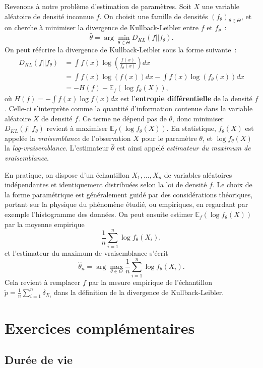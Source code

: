 Revenons à notre problème d'estimation de paramètres. Soit \(X\) une
variable aléatoire de densité inconnue \(f\). On choisit une famille de
densités \((f_\theta)_{\theta \in \Theta}\), et on cherche à minimiser
la divergence de Kullback-Leibler entre \(f\) et \(f_\theta\)~:
\[ \hat{\theta} = \arg\min_{\theta \in \Theta} D_{KL}(f||f_\theta).\] On
peut réécrire la divergence de Kullback-Leibler sous la forme suivante~:
\begin{align*}
D_{KL}(f||f_\theta) & = \int f(x) \log\left(\frac{f(x)}{f_\theta(x)}\right) dx \\
& = \int f(x) \log(f(x)) dx - \int f(x) \log(f_\theta(x)) dx \\
& = -H(f) - \mathbb{E}_f(\log f_\theta(X)),
\end{align*} où \(H(f) = -\int f(x) \log f(x) dx\) est
l'\textbf{entropie différentielle} de la densité \(f\). Celle-ci s'interprète comme la quantité d'information contenue dans la variable aléatoire \(X\) de densité \(f\).  Ce terme ne dépend pas de \(\theta\), donc minimiser
\(D_{KL}(f||f_\theta)\) revient à maximiser
\(\mathbb{E}_f(\log f_\theta(X))\). En statistique, \(f_\theta(X)\) est
appelée la \emph{vraisemblance} de l'observation \(X\) pour le paramètre
\(\theta\), et \(\log f_\theta(X)\) la \emph{log-vraisemblance}.
L'estimateur \(\hat{\theta}\) est ainsi appelé \emph{estimateur du
maximum de vraisemblance}.

En pratique, on dispose d'un échantillon \(X_1,\ldots,X_n\) de variables
aléatoires indépendantes et identiquement distribuées selon la loi de
densité \(f\). Le choix de la forme paramétrique est généralement guidé
par des considérations théoriques, portant sur la physique du phénomène
étudié, ou empiriques, en regardant par exemple l'histogramme des
données. On peut ensuite estimer \(\mathbb{E}_f(\log f_\theta(X))\) par
la moyenne empirique \[ \frac{1}{n} \sum_{i=1}^n \log f_\theta(X_i),\]
et l'estimateur du maximum de vraisemblance s'écrit
\[ \hat{\theta}_n = \arg\max_{\theta \in \Theta} \frac{1}{n} \sum_{i=1}^n \log f_\theta(X_i).\]
Cela revient à remplacer \(f\) par la mesure empirique de l'échantillon
\(\tilde{p} = \frac{1}{n} \sum_{i=1}^n \delta_{X_i}\) dans la définition
de la divergence de Kullback-Leibler.

\chapter{Exercices
complémentaires}\label{II-exercices-compluxe9mentaires}

\section{Durée de vie}\label{II-duruxe9e-de-vie}

